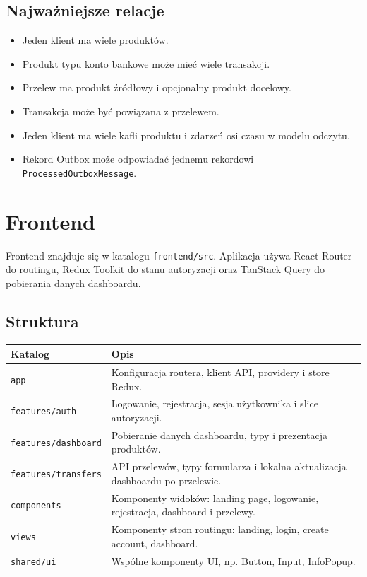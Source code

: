 \documentclass[12pt,a4paper]{article}
\begin{document}
\subsection{Najważniejsze relacje}

\begin{itemize}[nosep]
    \item Jeden klient ma wiele produktów.
    \item Produkt typu konto bankowe może mieć wiele transakcji.
    \item Przelew ma produkt źródłowy i opcjonalny produkt docelowy.
    \item Transakcja może być powiązana z przelewem.
    \item Jeden klient ma wiele kafli produktu i zdarzeń osi czasu w modelu odczytu.
    \item Rekord Outbox może odpowiadać jednemu rekordowi \texttt{ProcessedOutboxMessage}.
\end{itemize}

\section{Frontend}

Frontend znajduje się w katalogu \texttt{frontend/src}. Aplikacja używa React Router do routingu, Redux Toolkit do stanu autoryzacji oraz TanStack Query do pobierania danych dashboardu.

\subsection{Struktura}

\begin{longtable}{p{}p{}}
\toprule
\textbf{Katalog} & \textbf{Opis} \\
\midrule
\endhead
\texttt{app} & Konfiguracja routera, klient API, providery i store Redux. \\
\texttt{features/auth} & Logowanie, rejestracja, sesja użytkownika i slice autoryzacji. \\
\texttt{features/dashboard} & Pobieranie danych dashboardu, typy i prezentacja produktów. \\
\texttt{features/transfers} & API przelewów, typy formularza i lokalna aktualizacja dashboardu po przelewie. \\
\texttt{components} & Komponenty widoków: landing page, logowanie, rejestracja, dashboard i przelewy. \\
\texttt{views} & Komponenty stron routingu: landing, login, create account, dashboard. \\
\texttt{shared/ui} & Wspólne komponenty UI, np. Button, Input, InfoPopup. \\
\bottomrule
\end{longtable}
\end{document}
